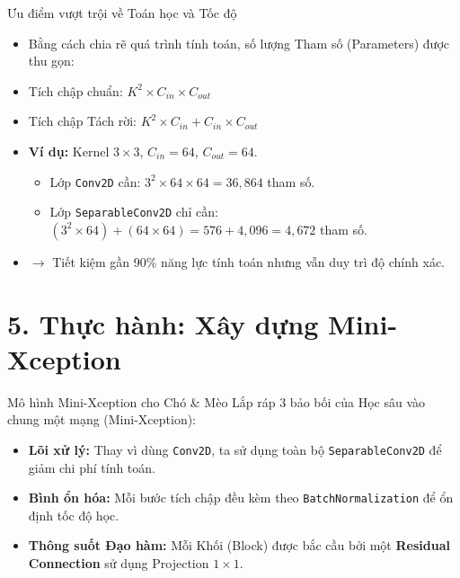 \documentclass[aspectratio=169]{beamer}
\begin{document}
\begin{frame}{Ưu điểm vượt trội về Toán học và Tốc độ}
    \begin{itemize}
        \item Bằng cách chia rẽ quá trình tính toán, số lượng Tham số (Parameters) được thu gọn:
        \item Tích chập chuẩn: $K^2 \times C_{in} \times C_{out}$
        \item Tích chập Tách rời: $K^2 \times C_{in} + C_{in} \times C_{out}$
        \item \textbf{Ví dụ:} Kernel $3 \times 3$, $C_{in}=64$, $C_{out}=64$.
        \begin{itemize}
            \item Lớp \texttt{Conv2D} cần: $3^2 \times 64 \times 64 = 36,864$ tham số.
            \item Lớp \texttt{SeparableConv2D} chỉ cần: $(3^2 \times 64) + (64 \times 64) = 576 + 4,096 = 4,672$ tham số.
        \end{itemize}
        \item $\rightarrow$ Tiết kiệm gần 90\% năng lực tính toán nhưng vẫn duy trì độ chính xác.
    \end{itemize}
\end{frame}

\section{5. Thực hành: Xây dựng Mini-Xception}

\begin{frame}{Mô hình Mini-Xception cho Chó \& Mèo}
    Lắp ráp 3 bảo bối của Học sâu vào chung một mạng (Mini-Xception):
    \begin{itemize}
        \item \textbf{Lõi xử lý:} Thay vì dùng \texttt{Conv2D}, ta sử dụng toàn bộ \texttt{SeparableConv2D} để giảm chi phí tính toán.
        \item \textbf{Bình ổn hóa:} Mỗi bước tích chập đều kèm theo \texttt{BatchNormalization} để ổn định tốc độ học.
        \item \textbf{Thông suốt Đạo hàm:} Mỗi Khối (Block) được bắc cầu bởi một \textbf{Residual Connection} sử dụng Projection $1 \times 1$.
    \end{itemize}
\end{frame}
\end{document}
